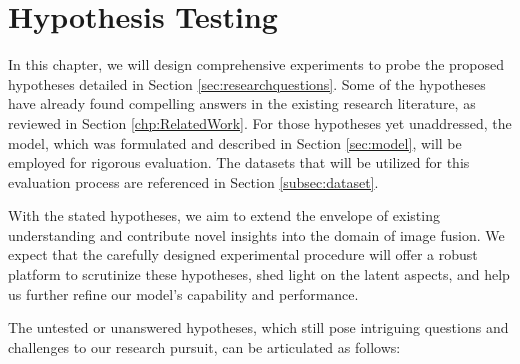 \chapter{Hypothesis Testing}

In this chapter, we will design comprehensive experiments to probe the proposed hypotheses detailed in Section \ref{sec:researchquestions}. Some of the hypotheses have already found compelling answers in the existing research literature, as reviewed in Section \ref{chp:RelatedWork}. For those hypotheses yet unaddressed, the model, which was formulated and described in Section \ref{sec:model}, will be employed for rigorous evaluation. The datasets that will be utilized for this evaluation process are referenced in Section \ref{subsec:dataset}. 

With the stated hypotheses, we aim to extend the envelope of existing understanding and contribute novel insights into the domain of image fusion. We expect that the carefully designed experimental procedure will offer a robust platform to scrutinize these hypotheses, shed light on the latent aspects, and help us further refine our model's capability and performance.

The untested or unanswered hypotheses, which still pose intriguing questions and challenges to our research pursuit, can be articulated as follows:

